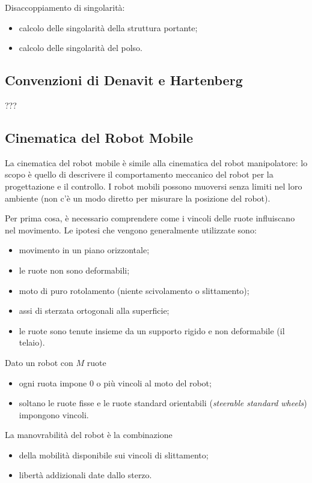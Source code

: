 \documentclass[a4paper,portrait,12pt]{article}
\theoremstyle{definition}
\begin{document}
Disaccoppiamento di singolarità:
\begin{itemize}
\item calcolo delle singolarità della struttura portante;
\item calcolo delle singolarità del polso.
\end{itemize}

\subsection{Convenzioni di Denavit e Hartenberg}
???


\subsection{Cinematica del Robot Mobile}

La cinematica del robot mobile è simile alla cinematica del robot manipolatore: lo scopo è quello di descrivere il comportamento meccanico del robot per la progettazione e il controllo.
I robot mobili possono muoversi senza limiti nel loro ambiente (non c'è un modo diretto per misurare la posizione del robot).

Per prima cosa, è necessario comprendere come i vincoli delle ruote influiscano nel movimento.
Le ipotesi che vengono generalmente utilizzate sono:
\begin{itemize}
\item movimento in un piano orizzontale;
\item le ruote non sono deformabili;
\item moto di puro rotolamento (niente scivolamento o slittamento);
\item assi di sterzata ortogonali alla superficie;
\item le ruote sono tenute insieme da un supporto rigido e non deformabile (il telaio).
\end{itemize}

Dato un robot con $M$ ruote
\begin{itemize}
\item ogni ruota impone 0 o più vincoli al moto del robot;
\item soltano le ruote fisse e le ruote standard orientabili (\emph{steerable standard wheels}) impongono vincoli.
\end{itemize}

La manovrabilità del robot è la combinazione
\begin{itemize}
\item della mobilità disponibile sui vincoli di slittamento;
\item libertà addizionali date dallo sterzo.
\end{itemize}
\end{document}
